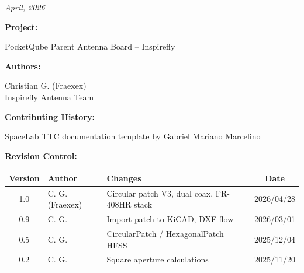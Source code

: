 %
%
%
%
%

%
%
%
%
%
%

\thispagestyle{empty}

\begin{center}

\textbf{\thetitle}

\textit{April, 2026}

\vspace{1cm}

\textbf{Project:}

PocketQube Parent Antenna Board -- Inspirefly

\vspace{1cm}

\textbf{Authors:}

Christian G. (Fraexex) \\
Inspirefly Antenna Team \\

\vspace{1cm}

\textbf{Contributing History:}

SpaceLab TTC documentation template by Gabriel Mariano Marcelino \\

\vspace{1cm}

\textbf{Revision Control:}

\end{center}

\begin{table}[!ht]
    \begin{center}
        \begin{tabular}{c l p{5cm} c}
            \toprule[1.5pt]
            \textbf{Version} & \textbf{Author}  & \textbf{Changes}    & \textbf{Date} \\
            \midrule
            1.0     & C. G. (Fraexex)           & Circular patch V3, dual coax, FR-408HR stack & 2026/04/28 \\
            0.9     & C. G.                     & Import patch to KiCAD, DXF flow & 2026/03/01 \\
            0.5     & C. G.                     & CircularPatch / HexagonalPatch HFSS & 2025/12/04 \\
            0.2     & C. G.                     & Square aperture calculations & 2025/11/20 \\
            \bottomrule[1.5pt]
        \end{tabular}
    \end{center}
\end{table}

